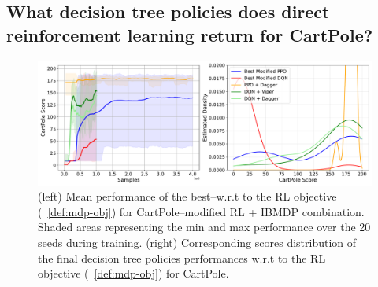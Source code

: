 \subsection{What decision tree policies does direct reinforcement learning return for CartPole?}

\begin{figure}
    \centering
    \includegraphics[width=1\textwidth]{images/images_part1/ppo_tree_study.pdf}
    \caption{(left) Mean performance of the best--w.r.t to the RL objective (~\ref{def:mdp-obj}) for CartPole--modified RL + IBMDP combination. Shaded areas representing the min and max performance over the 20 seeds during training. (right) Corresponding scores distribution of the final decision tree policies performances w.r.t to the RL objective (~\ref{def:mdp-obj}) for CartPole.}\label{fig:ppo-trees}
\end{figure}


